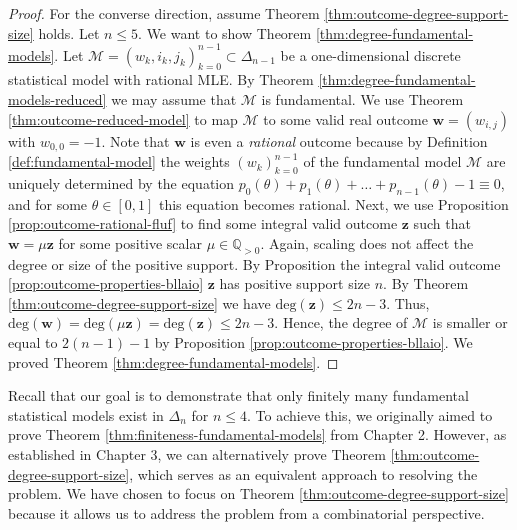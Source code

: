 \begin{proof}
    For the converse direction, assume Theorem \ref{thm:outcome-degree-support-size} holds. Let \( n \leq 5 \). We want to show Theorem \ref{thm:degree-fundamental-models}. Let \( \mathcal{M} = (w_k, i_k, j_k)_{k=0}^{n-1} \subset \Delta_{n-1} \) be a one-dimensional discrete statistical model with rational MLE. By Theorem \ref{thm:degree-fundamental-models-reduced} we may assume that \( \mathcal{M} \) is fundamental. We use Theorem \ref{thm:outcome-reduced-model} to map \( \mathcal{M} \) to some valid real outcome \( \mathbf{w} = (w_{i,j}) \) with \( w_{0,0} = -1 \). Note that \( \mathbf{w}  \) is even a \emph{rational} outcome because by Definition \ref{def:fundamental-model} the weights \( (w_k)_{k=0}^{n-1} \) of the fundamental model \( \mathcal{M} \) are uniquely determined by the equation \( p_0(\theta) + p_1(\theta) + \dots + p_{n-1}(\theta) - 1 \equiv 0 \), and for some \( \theta \in [0,1] \) this equation becomes rational. Next, we use Proposition \ref{prop:outcome-rational-fluf} to find some integral valid outcome \( \mathbf{z} \) such that \( \mathbf w = \mu \mathbf{z} \) for some positive scalar \( \mu \in \mathbb{Q}_{>0} \). Again, scaling does not affect the degree or size of the positive support. By Proposition the integral valid outcome \ref{prop:outcome-properties-bllaio} \( \mathbf{z} \) has positive support size \( n  \). By Theorem \ref{thm:outcome-degree-support-size} we have \( \mathrm{deg}(\mathbf z) \leq 2n - 3 \). Thus, \( \mathrm{deg}(\mathbf w) = \mathrm{deg}(\mu \mathbf z) = \mathrm{deg}(\mathbf z) \leq 2n - 3 \). Hence, the degree of \( \mathcal{M} \) is smaller or equal to \( 2(n-1) - 1 \) by Proposition \ref{prop:outcome-properties-bllaio}. We proved Theorem \ref{thm:degree-fundamental-models}.
\end{proof}

Recall that our goal is to demonstrate that only finitely many fundamental statistical models exist in \( \Delta_n \) for \( n \leq 4 \). To achieve this, we originally aimed to prove Theorem \ref{thm:finiteness-fundamental-models} from Chapter 2. However, as established in Chapter 3, we can alternatively prove Theorem \ref{thm:outcome-degree-support-size}, which serves as an equivalent approach to resolving the problem. We have chosen to focus on Theorem \ref{thm:outcome-degree-support-size} because it allows us to address the problem from a combinatorial perspective.
